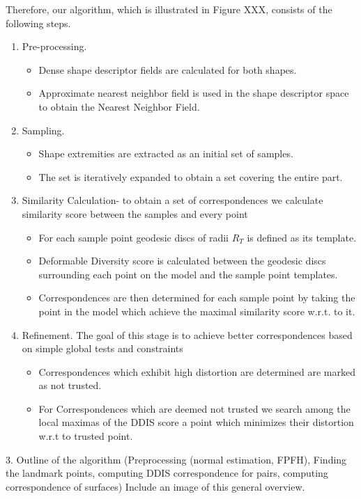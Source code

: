 \documentclass[10pt,twocolumn,letterpaper]{article}
\begin{document}
Therefore, our algorithm, which is illustrated in Figure XXX, consists of the following steps.
\begin{enumerate}
    \item 
    Pre-processing.
    \begin{itemize}
     \item Dense shape descriptor fields are calculated for both shapes.
     \item Approximate nearest neighbor field is used in the shape descriptor space to obtain the Nearest Neighbor Field.
   \end{itemize}
   \item
   Sampling.
   \begin{itemize}
     \item Shape extremities are extracted as an initial set of samples.
     \item The set is iteratively expanded to obtain a set covering the entire part.
   \end{itemize}
   \item
   Similarity Calculation- to obtain a set of correspondences we calculate similarity score between the samples and every point 
      \begin{itemize}
        \item For each sample point geodesic discs of radii $ R_T$ is defined as its template.
        \item Deformable Diversity score is calculated between the geodesic discs surrounding each point on the model and the sample point templates.
        \item Correspondences are then determined for each sample point by taking the point in the model which achieve the maximal similarity score w.r.t. to it.
       \end{itemize}
   \item

    Refinement. The goal of this stage is to achieve better correspondences based on simple global tests and constraints
      \begin{itemize}
        \item Correspondences which exhibit high distortion are determined are marked as not trusted.
        \item For Correspondences which are deemed not trusted we search among the local maximas of the DDIS score a point which minimizes their distortion w.r.t to trusted point.

   \end{itemize}

\end{enumerate}
{\color{red} 	3. Outline of the algorithm (Preprocessing (normal estimation, FPFH), Finding the landmark points, computing DDIS correspondence for pairs, computing correspondence of surfaces)
	Include an image of this general overview.}
\end{document}
